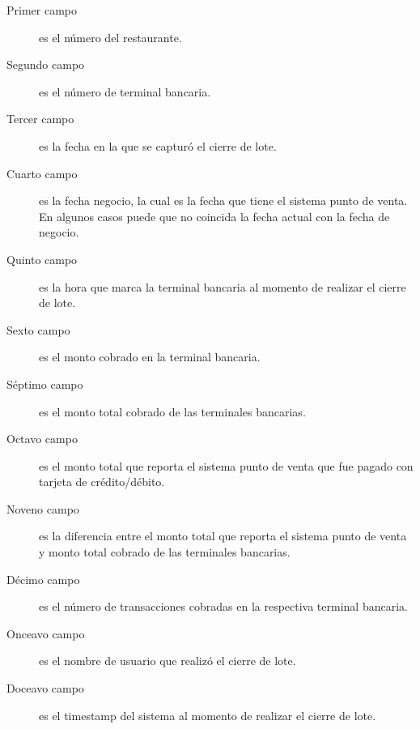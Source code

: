 \begin{description}
 \item[Primer campo] es el número del restaurante.
 \item[Segundo campo] es el número de terminal bancaria.
 \item[Tercer campo] es la fecha en la que se capturó el cierre de lote.
 \item[Cuarto campo] es la fecha negocio, la cual es la fecha que tiene el sistema punto de venta. En algunos casos puede que no coincida la fecha actual con la fecha de negocio.
 \item[Quinto campo] es la hora que marca la terminal bancaria al momento de realizar el cierre de lote.
 \item[Sexto campo] es el monto cobrado en la terminal bancaria.
 \item[Séptimo campo] es el monto total cobrado de las terminales bancarias.
 \item[Octavo campo] es el monto total que reporta el sistema punto de venta que fue pagado con tarjeta de crédito/débito.
 \item[Noveno campo] es la diferencia entre el monto total que reporta el sistema punto de venta y monto total cobrado de las terminales bancarias.
 \item[Décimo campo] es el número de transacciones cobradas en la respectiva terminal bancaria.
 \item[Onceavo campo] es el nombre de usuario que realizó el cierre de lote.
 \item[Doceavo campo] es el timestamp del sistema al momento de realizar el cierre de lote.
\end{description}


